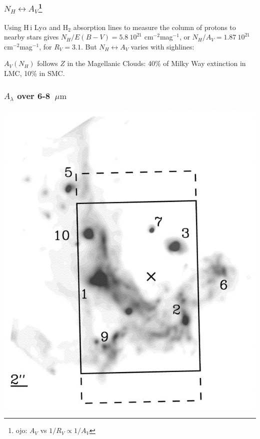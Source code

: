 \begin{frame}\frametitle{$N_H \leftrightarrow A_{V}$\footnote{
ojo: $A_V$ vs $1/R_V \propto 1/A_V$}}


Using H\,{\sc i} Ly$\alpha$ and H$_2$ absorption lines to measure the
column of protons to nearby stars gives $N_H / E(B-V) = 5.8~10^{21}$
cm$^{-2}$mag$^{-1}$, or $N_H / A_V = 1.87~10^{21}$
cm$^{-2}$mag$^{-1}$, for $R_V = 3.1$. But $N_H
\leftrightarrow A_{V}$  varies with sighlines:
\begin{center}
\end{center}
$A_V(N_H)$ follows $Z$ in the Magellanic Clouds: 40\% of Milky Way
extinction in LMC, 10\% in SMC.


\end{frame}
\begin{frame}\frametitle{$A_\lambda$ over 6-8~$\mu\mathrm{m}$ }


\begin{center}
\includegraphics[width=!,height=0.8\textwidth]{./D/ISO_field_GC.jpg}
\end{center}


\end{frame}
